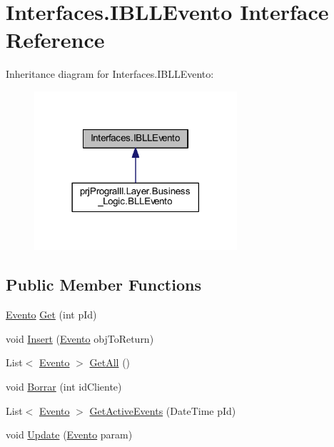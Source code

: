 \hypertarget{interface_interfaces_1_1_i_b_l_l_evento}{}\section{Interfaces.\+I\+B\+L\+L\+Evento Interface Reference}
\label{interface_interfaces_1_1_i_b_l_l_evento}


Inheritance diagram for Interfaces.\+I\+B\+L\+L\+Evento\+:
\nopagebreak
\begin{figure}[H]
\begin{center}
\leavevmode
\includegraphics[width=213pt]{interface_interfaces_1_1_i_b_l_l_evento__inherit__graph}
\end{center}
\end{figure}
\subsection*{Public Member Functions}
\begin{DoxyCompactItemize}
\item 
\hyperlink{classprj_progra_i_i_i_1_1_layer_1_1_entities_1_1_evento}{Evento} \hyperlink{interface_interfaces_1_1_i_b_l_l_evento_a1eae40dd8ed0fc8cd36ee9e4ed42f10e}{Get} (int p\+Id)
\item 
void \hyperlink{interface_interfaces_1_1_i_b_l_l_evento_ad26c4dba0bce0ce649b1e68e21cc194a}{Insert} (\hyperlink{classprj_progra_i_i_i_1_1_layer_1_1_entities_1_1_evento}{Evento} obj\+To\+Return)
\item 
List$<$ \hyperlink{classprj_progra_i_i_i_1_1_layer_1_1_entities_1_1_evento}{Evento} $>$ \hyperlink{interface_interfaces_1_1_i_b_l_l_evento_a2573cdfaf0097cfcf185b39ddaede2d8}{Get\+All} ()
\item 
void \hyperlink{interface_interfaces_1_1_i_b_l_l_evento_a5e0e267f475664adbac7b86dc847a1a7}{Borrar} (int id\+Cliente)
\item 
List$<$ \hyperlink{classprj_progra_i_i_i_1_1_layer_1_1_entities_1_1_evento}{Evento} $>$ \hyperlink{interface_interfaces_1_1_i_b_l_l_evento_ace54abf5be3a6b759890104aeebd6d62}{Get\+Active\+Events} (Date\+Time p\+Id)
\item 
void \hyperlink{interface_interfaces_1_1_i_b_l_l_evento_a905ad055ff01af7bace9440339d07514}{Update} (\hyperlink{classprj_progra_i_i_i_1_1_layer_1_1_entities_1_1_evento}{Evento} param)
\end{DoxyCompactItemize}


